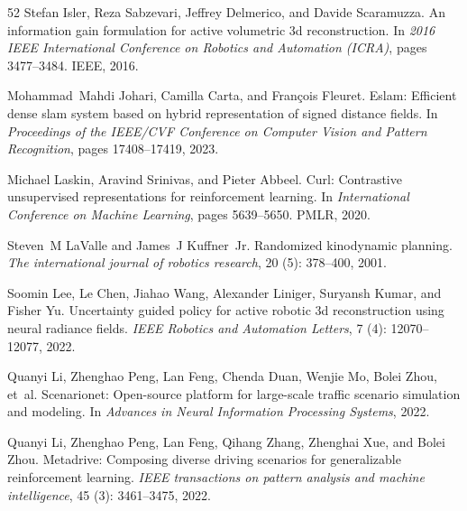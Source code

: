 \documentclass[10pt,twocolumn,letterpaper]{article}
\begin{document}
{\begin{thebibliography}{52}
Stefan Isler, Reza Sabzevari, Jeffrey Delmerico, and Davide Scaramuzza.
\newblock An information gain formulation for active volumetric 3d reconstruction.
\newblock In \emph{2016 IEEE International Conference on Robotics and Automation (ICRA)}, pages 3477--3484. IEEE, 2016.

Mohammad~Mahdi Johari, Camilla Carta, and Fran{\c{c}}ois Fleuret.
\newblock Eslam: Efficient dense slam system based on hybrid representation of signed distance fields.
\newblock In \emph{Proceedings of the IEEE/CVF Conference on Computer Vision and Pattern Recognition}, pages 17408--17419, 2023.

Michael Laskin, Aravind Srinivas, and Pieter Abbeel.
\newblock Curl: Contrastive unsupervised representations for reinforcement learning.
\newblock In \emph{International Conference on Machine Learning}, pages 5639--5650. PMLR, 2020.

Steven~M LaValle and James~J Kuffner~Jr.
\newblock Randomized kinodynamic planning.
\newblock \emph{The international journal of robotics research}, 20 (5): 378--400, 2001.

Soomin Lee, Le Chen, Jiahao Wang, Alexander Liniger, Suryansh Kumar, and Fisher Yu.
\newblock Uncertainty guided policy for active robotic 3d reconstruction using neural radiance fields.
\newblock \emph{IEEE Robotics and Automation Letters}, 7 (4): 12070--12077, 2022.

Quanyi Li, Zhenghao Peng, Lan Feng, Chenda Duan, Wenjie Mo, Bolei Zhou, et~al.
\newblock Scenarionet: Open-source platform for large-scale traffic scenario simulation and modeling.
\newblock In \emph{Advances in Neural Information Processing Systems}, 2022{}.

Quanyi Li, Zhenghao Peng, Lan Feng, Qihang Zhang, Zhenghai Xue, and Bolei Zhou.
\newblock Metadrive: Composing diverse driving scenarios for generalizable reinforcement learning.
\newblock \emph{IEEE transactions on pattern analysis and machine intelligence}, 45 (3): 3461--3475, 2022{}.


\end{thebibliography}}
\end{document}
